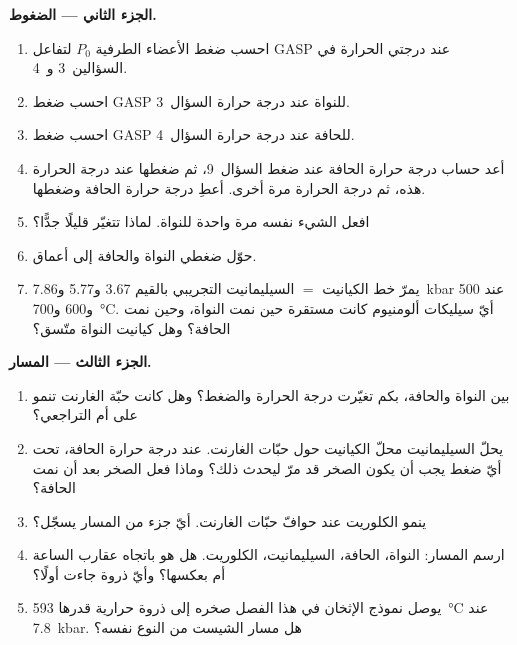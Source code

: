\begin{problem}
\noindent\textbf{الجزء الثاني --- الضغوط.}
\begin{enumerate}[resume]
\item احسب ضغط الأعضاء الطرفية $P_0$ لتفاعل GASP عند درجتي الحرارة
في السؤالين~3 و~4.
\item احسب ضغط GASP للنواة عند درجة حرارة السؤال~3.
\item احسب ضغط GASP للحافة عند درجة حرارة السؤال~4.
\item أعد حساب درجة حرارة الحافة عند ضغط السؤال~9، ثم ضغطها
عند درجة الحرارة هذه، ثم درجة الحرارة مرة أخرى. أعطِ درجة حرارة الحافة
وضغطها.
\item افعل الشيء نفسه مرة واحدة للنواة. لماذا تتغيّر قليلًا جدًّا؟
\item حوّل ضغطي النواة والحافة إلى أعماق.
\item يمرّ خط الكيانيت $=$ السيليمانيت التجريبي بالقيم 3.67 و5.77
و\qty{7.86}{kbar} عند 500 و600 و\qty{700}{\celsius}. أيّ سيليكات ألومنيوم كانت مستقرة
حين نمت النواة، وحين نمت الحافة؟ وهل كيانيت النواة متّسق؟
\end{enumerate}

\noindent\textbf{الجزء الثالث --- المسار.}
\begin{enumerate}[resume]
\item بين النواة والحافة، بكم تغيّرت درجة الحرارة والضغط؟
وهل كانت حبّة الغارنت تنمو على  أم التراجعي؟
\item يحلّ السيليمانيت محلّ الكيانيت حول حبّات الغارنت. عند درجة حرارة الحافة،
تحت أيّ ضغط يجب أن يكون الصخر قد مرّ ليحدث ذلك؟ وماذا فعل الصخر
بعد أن نمت الحافة؟
\item ينمو الكلوريت عند حوافّ حبّات الغارنت. أيّ جزء من المسار يسجّل؟
\item ارسم المسار: النواة، الحافة، السيليمانيت، الكلوريت. هل هو باتجاه عقارب الساعة أم بعكسها؟
وأيّ ذروة جاءت أولًا؟
\item يوصل نموذج الإثخان في هذا الفصل صخره إلى ذروة حرارية قدرها
\qty{593}{\celsius} عند \qty{7.8}{kbar}. هل مسار الشيست من النوع نفسه؟
\end{enumerate}


\end{problem}
